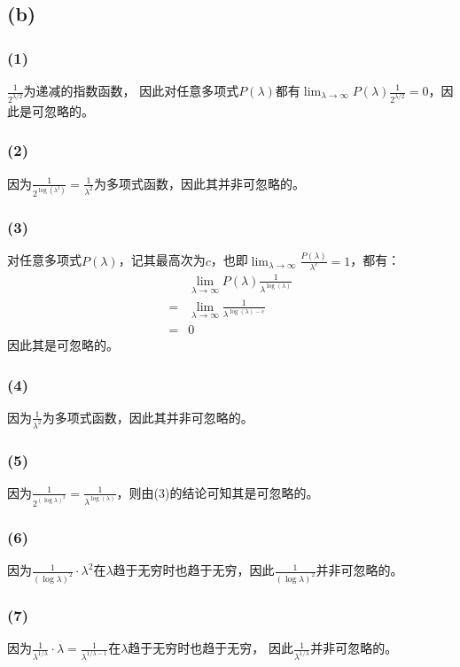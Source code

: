 \documentclass[twoside,11pt]{article}
\begin{document}
\subsection*{(b)}
\subsubsection*{(1)}
$\frac{1}{2^{\lambda / 2}}$为递减的指数函数，
因此对任意多项式$P(\lambda)$都有$\lim_{\lambda \to \infty} P(\lambda)\frac{1}{2^{\lambda / 2}} =0$，因此是可忽略的。

\subsubsection*{(2)}
因为$\frac{1}{2^{\log (\lambda^2)}} = \frac{1}{\lambda^2}$为多项式函数，因此其并非可忽略的。

\subsubsection*{(3)}
对任意多项式$P(\lambda)$，记其最高次为$c$，也即$\lim_{\lambda \to \infty} \frac{P(\lambda)}{\lambda^c}=1$，都有：
\begin{align*}
      & \lim_{\lambda \to \infty} P(\lambda)\frac{1}{\lambda^{\log (\lambda)}} \\
    = & \lim_{\lambda \to \infty} \frac{1}{\lambda^{\log (\lambda)-c}}         \\
    = & 0
\end{align*}
因此其是可忽略的。

\subsubsection*{(4)}
因为$\frac{1}{\lambda^2}$为多项式函数，因此其并非可忽略的。

\subsubsection*{(5)}
因为$\frac{1}{2^{(\log \lambda)^2}} = \frac{1}{\lambda^{\log (\lambda)}}$，则由(3)的结论可知其是可忽略的。

\subsubsection*{(6)}
因为$\frac{1}{(\log \lambda)^2} \cdot \lambda^2$在$\lambda$趋于无穷时也趋于无穷，因此$\frac{1}{(\log \lambda)^2}$并非可忽略的。

\subsubsection*{(7)}
因为$\frac{1}{\lambda^{1 / \lambda}} \cdot \lambda = \frac{1}{\lambda^{1 / \lambda-1}}$在$\lambda$趋于无穷时也趋于无穷，
因此$\frac{1}{\lambda^{1 / \lambda}}$并非可忽略的。
\end{document}
